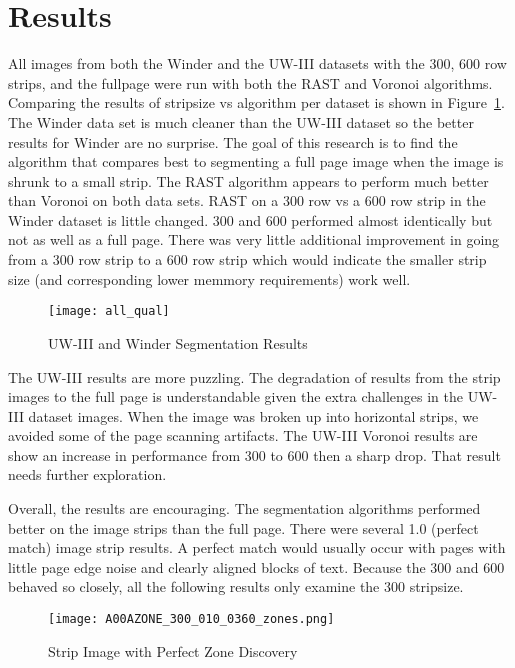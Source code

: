 \documentclass[conference]{IEEEtran}
\begin{document}
\section{Results}

All images from both the Winder and the UW-III datasets with 
the 300, 600 row strips, and the fullpage were run with both the RAST and
Voronoi algorithms. Comparing the results of stripsize vs algorithm per dataset
is shown in Figure~\ref{fig:all-qualitative}. The Winder data set is much
cleaner than the UW-III dataset so the better results for Winder are no
surprise. The goal of this research is to find the algorithm that compares best
to segmenting a full page image when the image is shrunk to a small strip. The
RAST algorithm appears to perform much better than Voronoi on both data sets.
RAST on a 300 row vs a 600 row strip in the Winder dataset is little changed.
300 and 600 performed almost identically but not as well as a full page. There
was very little additional improvement in going from a 300 row strip to a 600
row strip which would indicate the smaller strip size (and corresponding lower
memmory requirements) work well.

\begin{figure}[all-qualitative]
\texttt{[image: all\_qual]}
\caption{UW-III and Winder Segmentation Results}
\label{fig:all-qualitative}
\end{figure}

The UW-III results are more puzzling. The degradation of results from the
strip images to the full page is understandable given the extra challenges in
the UW-III dataset images. When the image was broken up into horizontal strips,
we avoided some of the page scanning artifacts. The UW-III Voronoi results are
show an increase in performance from 300 to 600 then a sharp drop. That result
needs further exploration.

Overall, the results are encouraging. The segmentation algorithms performed
better on the image strips than the full page. There were several 1.0 (perfect
match) image strip results. A perfect match would usually occur with
pages with little page edge noise and clearly aligned blocks of text. Because
the 300 and 600 behaved so closely, all the following results only examine the
300 stripsize. 

\begin{figure}[strip-image-showing-perfect-hit]
\texttt{[image: A00AZONE\_300\_010\_0360\_zones.png]}
\caption{Strip Image with Perfect Zone Discovery}
\label{fig:strip-image-showing-perfect-hit}
\end{figure}
\end{document}
